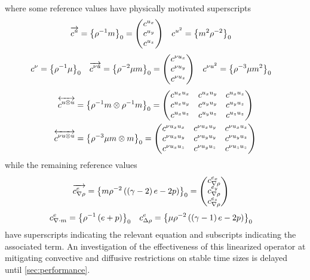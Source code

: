 where some reference values have physically motivated superscripts
\begin{align*}
  \overrightarrow{c^{u}} &= \left\{\rho^{-1}m\right\}_{0}
  = \begin{pmatrix} c^{u_x} \\ c^{u_y} \\ c^{u_z} \end{pmatrix}
&
  c^{u^2} &= \left\{m^{2}\rho^{-2}\right\}_{0}
\end{align*}
\begin{align*}
  c^{\nu} &= \left\{\rho^{-1}\mu\right\}_{0}
&
  \overrightarrow{c^{\nu{}u}} &= \left\{\rho^{-2}\mu{}m\right\}_{0}
  = \begin{pmatrix} c^{\nu{}u_x} \\ c^{\nu{}u_y} \\ c^{\nu{}u_z} \end{pmatrix}
&
  c^{\nu{}u^2} &= \left\{\rho^{-3}\mu{}m^2\right\}_{0}
\end{align*}
\begin{align*}
   \overleftrightarrow{c^{u\otimes{}u}}
 &= \left\{\rho^{-1}m\otimes\rho^{-1}m\right\}_{0}
  = \begin{pmatrix}
   c^{u_x u_x} & c^{u_x u_y} & c^{u_x u_z} \\
   c^{u_x u_y} & c^{u_y u_y} & c^{u_y u_z} \\
   c^{u_x u_z} & c^{u_y u_z} & c^{u_z u_z}
  \end{pmatrix}
\\
   \overleftrightarrow{c^{\nu{}u\otimes{}u}}
 &= \left\{\rho^{-3}\mu{}m\otimes{}m\right\}_{0}
  = \begin{pmatrix}
   c^{\nu{} u_x u_x} & c^{\nu{} u_x u_y} & c^{\nu{} u_x u_z} \\
   c^{\nu{} u_x u_y} & c^{\nu{} u_y u_y} & c^{\nu{} u_y u_z} \\
   c^{\nu{} u_x u_z} & c^{\nu{} u_y u_z} & c^{\nu{} u_z u_z}
  \end{pmatrix}
\end{align*}
while the remaining reference values
\begin{align*}
  \overrightarrow{c^{e}_{\nabla\rho}} &= \reference{%
        m\rho^{-2}\left(\left(\gamma-2\right)e-2p\right)
  }
  = \begin{pmatrix}
      c^{e_{x}}_{\nabla\rho} \\
      c^{e_{y}}_{\nabla\rho} \\
      c^{e_{z}}_{\nabla\rho}
  \end{pmatrix}
\end{align*}
\begin{align*}
  c^{e}_{\nabla\cdot{}m} &= \reference{%
        \rho^{-1}\left(e + p\right)
  }
&
  c^{e}_{\Delta\rho} &= \reference{%
        \mu\rho^{-2}\left(\left(\gamma-1\right)e-2p\right)
  }
\end{align*}
have superscripts indicating the relevant equation and
subscripts indicating the associated term.
%
An investigation of the effectiveness of this linearized operator at mitigating
convective and diffusive restrictions on stable time sizes is delayed until
\autoref{sec:performance}.


